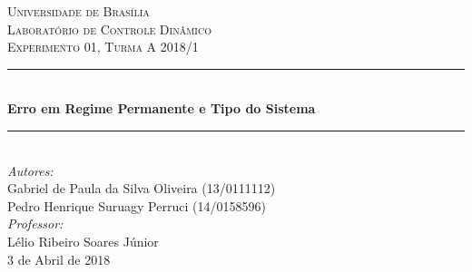 \begin{titlepage}

\newcommand{\HRule}{\rule{\linewidth}{0.5mm}} %

\center %
 

\textsc{\LARGE Universidade de Brasília}\\[1.5cm] %
\textsc{\Large Laboratório de Controle Dinâmico}\\[0.5cm] %
\textsc{\large Experimento 01, Turma A 2018/1}\\[0.5cm] %


\HRule \\[0.4cm]
{ \huge \bfseries Erro em Regime Permanente e Tipo do Sistema}\\[0.4cm] %
\HRule \\[0.6cm]
 

\Large \emph{Autores:}\\
Gabriel de Paula da Silva Oliveira (13/0111112) \\
Pedro Henrique Suruagy Perruci (14/0158596)\\[0.3cm]

\Large \emph{Professor:}\\
Lélio Ribeiro Soares Júnior\\[0.3cm]

{\large 3 de Abril de 2018}\\[1cm] %


\end{titlepage}
